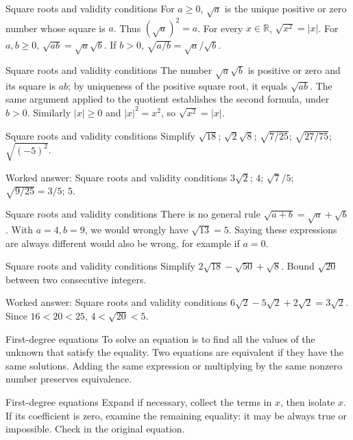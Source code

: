 \documentclass[aspectratio=169,10pt]{beamer}
\providecommand{\R}{\mathbb{R}}
\begin{document}
\begin{frame}{Square roots and validity conditions}
For \(a\geq0\), \(\sqrt a\) is the unique positive or zero number whose square is \(a\). Thus \((\sqrt a)^2=a\). For every \(x\in\R\), \(\sqrt{x^2}=|x|\).
For \(a,b\geq0\), \(\sqrt{ab}=\sqrt a\sqrt b\). If \(b>0\), \(\sqrt{a/b}=\sqrt a/\sqrt b\).
\end{frame}
\begin{frame}{Square roots and validity conditions}
The number \(\sqrt a\sqrt b\) is positive or zero and its square is \(ab\); by uniqueness of the positive square root, it equals \(\sqrt{ab}\). The same argument applied to the quotient establishes the second formula, under \(b>0\). Similarly \(|x|\geq0\) and \(|x|^2=x^2\), so \(\sqrt{x^2}=|x|\).
\end{frame}
\begin{frame}{Square roots and validity conditions}
Simplify \(\sqrt{18}\); \(\sqrt2\sqrt8\); \(\sqrt{7/25}\); \(\sqrt{27/75}\); \(\sqrt{(-5)^2}\).
\end{frame}
\begin{frame}{Worked answer: Square roots and validity conditions}
\(3\sqrt2\); \(4\); \(\sqrt7/5\); \(\sqrt{9/25}=3/5\); \(5\).
\end{frame}
\begin{frame}{Square roots and validity conditions}
There is no general rule \(\sqrt{a+b}=\sqrt a+\sqrt b\). With \(a=4,b=9\), we would wrongly have \(\sqrt{13}=5\). Saying these expressions are always different would also be wrong, for example if \(a=0\).
\end{frame}
\begin{frame}{Square roots and validity conditions}
Simplify \(2\sqrt{18}-\sqrt{50}+\sqrt8\). Bound \(\sqrt{20}\) between two consecutive integers.
\end{frame}
\begin{frame}{Worked answer: Square roots and validity conditions}
\(6\sqrt2-5\sqrt2+2\sqrt2=3\sqrt2\). Since \(16<20<25\), \(4<\sqrt{20}<5\).
\end{frame}
\begin{frame}{First-degree equations}
To solve an equation is to find all the values of the unknown that satisfy the equality. Two equations are equivalent if they have the same solutions. Adding the same expression or multiplying by the same nonzero number preserves equivalence.
\end{frame}
\begin{frame}{First-degree equations}
Expand if necessary, collect the terms in \(x\), then isolate \(x\). If its coefficient is zero, examine the remaining equality: it may be always true or impossible. Check in the original equation.
\end{frame}
\end{document}

